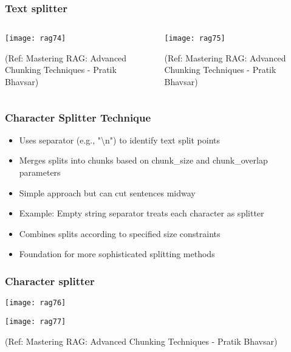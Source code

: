\begin{frame}[fragile]\frametitle{Text splitter}

 \begin{columns}
    \begin{column}[T]{0.5\linewidth}
  	\begin{center}
	\texttt{[image: rag74]}
		
	{\tiny (Ref: Mastering RAG: Advanced Chunking Techniques - Pratik Bhavsar)}
	
	\end{center}

    \end{column}
    \begin{column}[T]{0.5\linewidth}
  	\begin{center}
	\texttt{[image: rag75]}
	
	{\tiny (Ref: Mastering RAG: Advanced Chunking Techniques - Pratik Bhavsar)}
	
	\end{center}
    \end{column}
  \end{columns}
  
\end{frame}

\begin{frame}[fragile]\frametitle{Character Splitter Technique}
      \begin{itemize}
\item Uses separator (e.g., "\textbackslash n") to identify text split points
\item Merges splits into chunks based on chunk\_size and chunk\_overlap parameters
\item Simple approach but can cut sentences midway
\item Example: Empty string separator treats each character as splitter
\item Combines splits according to specified size constraints
\item Foundation for more sophisticated splitting methods
  \end{itemize}
\end{frame}

\begin{frame}[fragile]\frametitle{Character splitter}

  
  	\begin{center}
	\texttt{[image: rag76]}
	
	\texttt{[image: rag77]}
	
	{\tiny (Ref: Mastering RAG: Advanced Chunking Techniques - Pratik Bhavsar)}
	
	\end{center}
\end{frame}

